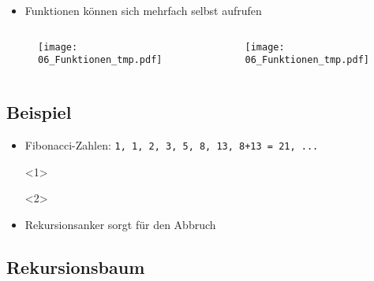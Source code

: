 \begin{frame}[t]
    \slidehead

    \begin{itemize}
        \item Funktionen können sich mehrfach selbst aufrufen
    \end{itemize}

    \begin{columns}
        \begin{column}{5cm}
            \begin{figure}
                \texttt{[image: 06\_Funktionen\_tmp.pdf]}
            \end{figure}
        \end{column}

        \begin{column}{5cm}
            \begin{figure}
                \texttt{[image: 06\_Funktionen\_tmp.pdf]}
            \end{figure}
        \end{column}
    \end{columns}
\end{frame}

\subsection*{Beispiel}
\begin{frame}
    \slidehead

    \begin{itemize}
        \item Fibonacci-Zahlen: \texttt{1, 1, 2, 3, 5, 8, 13, 8+13 = 21, ...}
            \begin{onlyenv}<1>
            \end{onlyenv}

            \begin{onlyenv}<2>
            \end{onlyenv}

        \item<2> Rekursionsanker sorgt für den Abbruch
    \end{itemize}

\end{frame}

\subsection{Rekursionsbaum}

